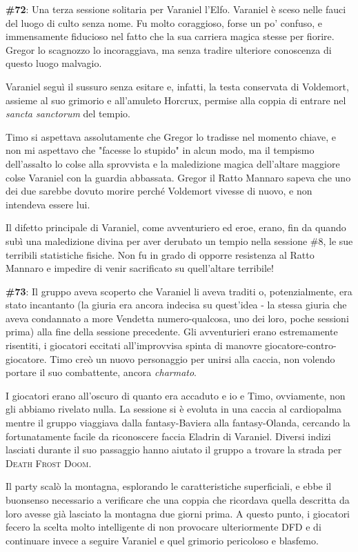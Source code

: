\textbf{\#72}: Una terza sessione solitaria per Varaniel l'Elfo. Varaniel è sceso nelle fauci del luogo di culto senza nome. Fu molto coraggioso, forse un po' confuso, e immensamente fiducioso nel fatto che la sua carriera magica stesse per fiorire. Gregor lo scagnozzo lo incoraggiava, ma senza tradire ulteriore conoscenza di questo luogo malvagio.

Varaniel seguì il sussuro senza esitare e, infatti, la testa conservata di Voldemort, assieme al suo grimorio e all'amuleto Horcrux, permise alla coppia di entrare nel \textit{sancta sanctorum} del tempio.

Timo si aspettava assolutamente che Gregor lo tradisse nel momento chiave, e non mi aspettavo che "facesse lo stupido" in alcun modo, ma il tempismo dell'assalto lo colse alla sprovvista e la maledizione magica dell'altare maggiore colse Varaniel con la guardia abbassata. Gregor il Ratto Mannaro sapeva che uno dei due sarebbe dovuto morire perché Voldemort vivesse di nuovo, e non intendeva essere lui.

Il difetto principale di Varaniel, come avventuriero ed eroe, erano, fin da quando subì una maledizione divina per aver derubato un tempio nella sessione \#8, le sue terribili statistiche fisiche. Non fu in grado di opporre resistenza al Ratto Mannaro e impedire di venir sacrificato su quell'altare terribile!

\textbf{\#73}: Il gruppo aveva scoperto che Varaniel li aveva traditi o, potenzialmente, era stato incantanto (la giuria era ancora indecisa su quest'idea - la stessa giuria che aveva condannato a more Vendetta numero-qualcosa, uno dei loro, poche sessioni prima) alla fine della sessione precedente. Gli avventurieri erano estremamente risentiti, i giocatori eccitati all'improvvisa spinta di manovre giocatore-contro-giocatore. Timo creò un nuovo personaggio per unirsi alla caccia, non volendo portare il suo combattente, ancora \textit{charmato}.

I giocatori erano all'oscuro di quanto era accaduto e io e Timo, ovviamente, non gli abbiamo rivelato nulla. La sessione si è evoluta in una caccia al cardiopalma mentre il gruppo viaggiava dalla fantasy-Baviera alla fantasy-Olanda, cercando la fortunatamente facile da riconoscere faccia Eladrin di Varaniel. Diversi indizi lasciati durante il suo passaggio hanno aiutato il gruppo a trovare la strada per \textsc{Death Frost Doom}.

Il party scalò la montagna, esplorando le caratteristiche superficiali, e ebbe il buonsenso necessario a verificare che una coppia che ricordava quella descritta da loro avesse già lasciato la montagna due giorni prima. A questo punto, i giocatori fecero la scelta molto intelligente di non provocare ulteriormente \textsc{DFD} e di continuare invece a seguire Varaniel e quel grimorio pericoloso e blasfemo.

